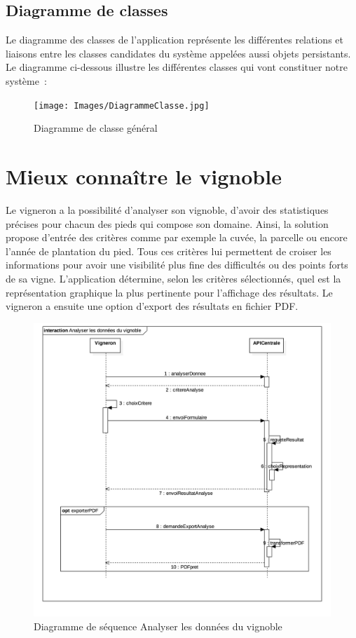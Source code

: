\documentclass[a4paper, title]{report}
\begin{document}
\subsection{Diagramme de classes}\label{diagramme-de-classes}

Le diagramme des classes de l'application représente les différentes
relations et liaisons entre les classes candidates du système appelées
aussi objets persistants. Le diagramme ci-dessous illustre les
différentes classes qui vont constituer notre système~:

\begin{figure}
\centering
\texttt{[image: Images/DiagrammeClasse.jpg]}
\caption{Diagramme de classe général}
\end{figure}

\section{Mieux connaître le vignoble}\label{mieux-connaitre-le-vignoble}

Le vigneron a la possibilité d'analyser son vignoble, d'avoir des
statistiques précises pour chacun des pieds qui compose son domaine.
Ainsi, la solution propose d'entrée des critères comme par exemple la
cuvée, la parcelle ou encore l'année de plantation du pied. Tous ces
critères lui permettent de croiser les informations pour avoir une
visibilité plus fine des difficultés ou des points forts de sa vigne.
L'application détermine, selon les critères sélectionnés, quel est la
représentation graphique la plus pertinente pour l'affichage des
résultats. Le vigneron a ensuite une option d'export des résultats en
fichier PDF.

\begin{figure}
\centering
\includegraphics{Images/SequenceDiagramAnalyserDonneesVignoble.jpg}
\caption{Diagramme de séquence Analyser les données du vignoble}
\end{figure}
\end{document}
